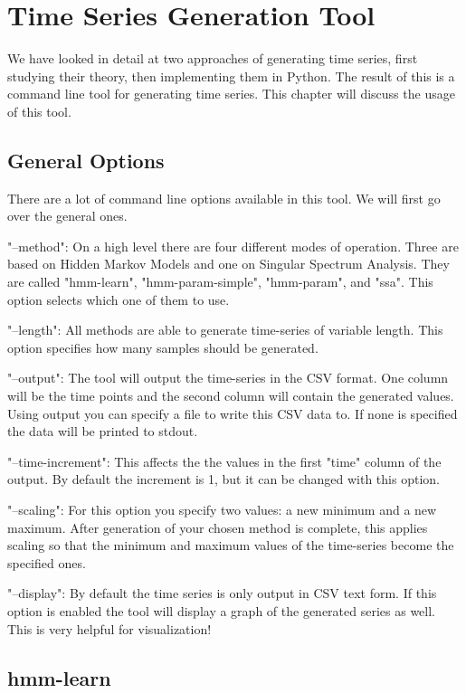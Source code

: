 \chapter{Time Series Generation Tool}\label{chapter:tool}

We have looked in detail at two approaches of generating time series, first studying their theory, then implementing them in Python. The result of this is a command line tool for generating time series. This chapter will discuss the usage of this tool. 

\section{General Options}

There are a lot of command line options available in this tool. We will first go over the general ones. 

"--method": On a high level there are four different modes of operation. Three are based on Hidden Markov Models and one on Singular Spectrum Analysis. They are called "hmm-learn", "hmm-param-simple", "hmm-param", and "ssa". This option selects which one of them to use. 

"--length": All methods are able to generate time-series of variable length. This option specifies how many samples should be generated. 

"--output": The tool will output the time-series in the CSV format. One column will be the time points and the second column will contain the generated values. Using output you can specify a file to write this CSV data to. If none is specified the data will be printed to stdout. 

"--time-increment": This affects the the values in the first "time" column of the output. By default the increment is 1, but it can be changed with this option. 

"--scaling": For this option you specify two values: a new minimum and a new maximum. After generation of your chosen method is complete, this applies scaling so that the minimum and maximum values of the time-series become the specified ones. 

"--display": By default the time series is only output in CSV text form. If this option is enabled the tool will display a graph of the generated series as well. This is very helpful for visualization!

\section{hmm-learn}

